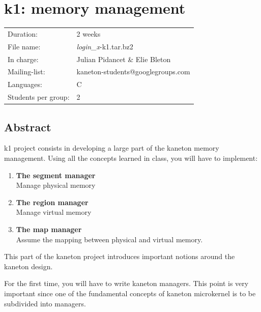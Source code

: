 
%
%

\chapter{k1: memory management}

%
%

\begin{tabular}{p{7cm}l}
Duration: & 2 weeks \\
File name: & {\em login\_x}-k1.tar.bz2 \\
In charge: & Julian Pidancet \& Elie Bleton\\
Mailing-list: & kaneton-students@googlegroups.com \\
Languages: & C \\
Students per group: & 2 \\
\end{tabular}

\section{Abstract}

k1 project consists in developing a large part of the kaneton memory management. Using all the concepts learned in class, you will have to implement:

\begin{enumerate}
  \item
    {\bf The segment manager}\\
    Manage physical memory
  \item
    {\bf The region manager}\\
    Manage virtual memory
  \item
    {\bf The map manager}\\
    Assume the mapping between physical and virtual memory.\\
\end{enumerate}

This part of the kaneton project introduces important notions around the
kaneton design.

For the first time, you will have to write kaneton managers. This point is
very important since one of the fundamental concepts of kaneton microkernel
is to be subdivided into managers.

